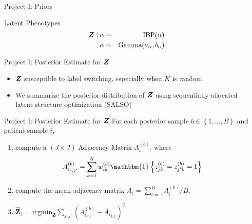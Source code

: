 \documentclass[ignorenonframetext,]{beamer}
\newcommand{\bc}[1]{ \left\{#1\right\} }
\newcommand{\bZ}{\mbox{\boldmath $Z$}}
\newcommand{\Ind}[1]{\mathbbm{1}\bc{#1}}
\begin{document}
\begin{frame}{Project I: Priors}
\begin{block}{Latent Phenotypes}
\begin{eqnarray*}
  \bZ \mid \alpha &\sim& \text{IBP}(\alpha) \\
  \alpha &\sim& \text{Gamma}(a_\alpha, b_\alpha) \\
\end{eqnarray*}
\end{block}
\end{frame}


\begin{frame}{Project I: Posterior Estimate for $\bZ$}
  \begin{itemize}
    \setlength\itemsep{1em}
    \item $\bZ$ susceptible to label switching, especially when $K$ is random
    \item We summarize the posterior distribution of $\bZ$ using sequentially-allocated latent structure optimization (SALSO) \citep{salso}
  \end{itemize}
\end{frame}

\begin{frame}{Project I: Posterior Estimate for $\bZ$}
For each posterior sample $b\in \bc{1,...,B}$ and patient sample $i$,
\begin{enumerate}
\item compute a $(J\times J)$ Adjacency Matrix $A_i^{(b)}$, where
  $$
  A^{(b)}_{i_{j,j'}} = \sum_{k=1}^K w^{(b)}_{ik} 
  \Ind{ z^{(b)}_{jk} = z^{(b)}_{j^\prime k} = 1}
  $$
\item compute the mean adjacency matrix \(\bar A_i = \sum_{b=1}^B A_i^{(b)} /
B\).
\item $\hat{\bm Z}_i = \text{argmin}_{\bm Z} \sum_{j,j'} (A_{i_{j,j'}}^{(b)} - \bar A_{i_{j,j'}})^2$
\end{enumerate}
\end{frame}
\end{document}
